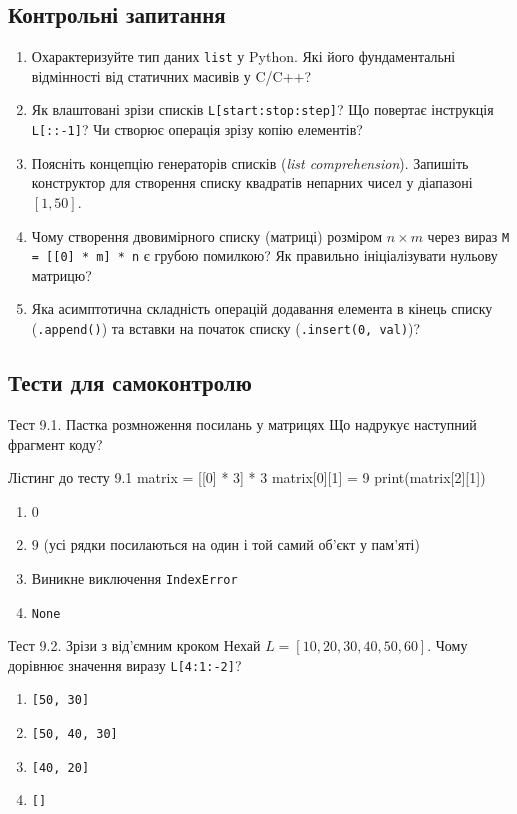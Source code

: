 \subsection*{Контрольні запитання}
\begin{enumerate}[label=\textbf{9.\arabic*.}]
	\item Охарактеризуйте тип даних \texttt{list} у Python. Які його фундаментальні відмінності від статичних масивів у C/C++?
	\item Як влаштовані зрізи списків \texttt{L[start:stop:step]}? Що повертає інструкція \texttt{L[::-1]}? Чи створює операція зрізу копію елементів?
	\item Поясніть концепцію генераторів списків (\textit{list comprehension}). Запишіть конструктор для створення списку квадратів непарних чисел у діапазоні $[1, 50]$.
	\item Чому створення двовимірного списку (матриці) розміром $n \times m$ через вираз \texttt{M = [[0] * m] * n} є грубою помилкою? Як правильно ініціалізувати нульову матрицю?
	\item Яка асимптотична складність операцій додавання елемента в кінець списку (\texttt{.append()}) та вставки на початок списку (\texttt{.insert(0, val)})?
\end{enumerate}

\subsection*{Тести для самоконтролю}

\begin{pr}{Тест 9.1. Пастка розмноження посилань у матрицях}
Що надрукує наступний фрагмент коду?
\begin{py}{Лістинг до тесту 9.1}
matrix = [[0] * 3] * 3
matrix[0][1] = 9
print(matrix[2][1])
\end{py}
\begin{enumerate}[label=\textbf{\Alph*.}]
	\item $0$
	\item $9$ (усі рядки посилаються на один і той самий об'єкт у пам'яті)
	\item Виникне виключення \texttt{IndexError}
	\item \texttt{None}
\end{enumerate}
\end{pr}

\begin{pr}{Тест 9.2. Зрізи з від'ємним кроком}
Нехай $L = [10, 20, 30, 40, 50, 60]$. Чому дорівнює значення виразу \texttt{L[4:1:-2]}?
\begin{enumerate}[label=\textbf{\Alph*.}]
	\item \texttt{[50, 30]}
	\item \texttt{[50, 40, 30]}
	\item \texttt{[40, 20]}
	\item \texttt{[]}
\end{enumerate}
\end{pr}

